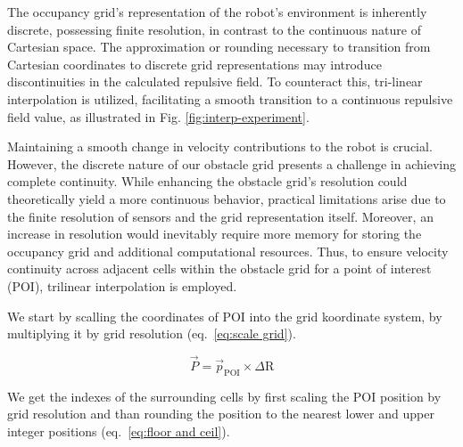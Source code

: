 \documentclass[letterpaper, 10 pt, conference]{ieeeconf}  %
\begin{document}
The occupancy grid's representation of the robot's environment is inherently discrete, possessing finite resolution, in contrast to the continuous nature of Cartesian space. The approximation or rounding necessary to transition from Cartesian coordinates to discrete grid representations may introduce discontinuities in the calculated repulsive field. To counteract this, tri-linear interpolation is utilized, facilitating a smooth transition to a continuous repulsive field value, as illustrated in Fig. \ref{fig:interp-experiment}.

Maintaining a smooth change in velocity contributions to the robot is crucial. However, the discrete nature of our obstacle grid presents a challenge in achieving complete continuity. While enhancing the obstacle grid's resolution could theoretically yield a more continuous behavior, practical limitations arise due to the finite resolution of sensors and the grid representation itself. Moreover, an increase in resolution would inevitably require more memory for storing the occupancy grid and additional computational resources. Thus, to ensure velocity continuity across adjacent cells within the obstacle grid for a point of interest (POI), trilinear interpolation is employed.

We start by scalling the coordinates of POI into the grid koordinate system, by multiplying it by grid resolution (eq.~\ref{eq:scale grid}). 

\begin{equation}
	\label{eq:scale grid}
	\vec{P} = \vec{p}_{\mathrm{POI}} \times\Delta \mathrm{R}
\end{equation}

We get the indexes of the surrounding cells by first scaling the POI position by grid resolution and than rounding the position to the nearest lower and upper integer positions (eq.~\ref{eq:floor and ceil}).

%
%
\end{document}
